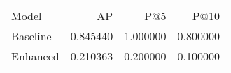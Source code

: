 \begin{tabular}{lrrr}
Model & AP & P@5 & P@10 \\
Baseline & 0.845440 & 1.000000 & 0.800000 \\
Enhanced & 0.210363 & 0.200000 & 0.100000 \\
\end{tabular}
